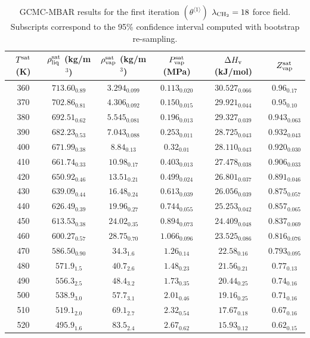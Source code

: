 \documentclass[journal=jctc,manuscript=article]{achemso}
\begin{document}
	\begin{table}[htb!]
		\caption{GCMC-MBAR results for the first iteration $(\theta^{\langle1\rangle})$ $\lambda_{\rm CH_2} = 18$ force field. Subscripts correspond to the 95\% confidence interval computed with bootstrap re-sampling.}
		\begin{center}
			\begin{tabular}{|c|c|c|c|c|c|}
				\hline
				$T^{\rm sat}$ (K) & $\rho_{\rm liq}^{\rm sat}$ (kg/m$^3$) & $\rho_{\rm vap}^{\rm sat}$ (kg/m$^3$) & $P_{\rm vap}^{\rm sat}$ (MPa) & $\Delta H_{\rm v}$ (kJ/mol) & $Z_{\rm vap}^{\rm sat}$ \\ \hline
				360 & $713.60_{0.89}$ & $3.294_{0.099}$ & $0.113_{0.020}$ & $30.527_{0.066}$ & $0.96_{0.17}$ \\
				370 & $702.86_{0.81}$ & $4.306_{0.092}$ & $0.150_{0.015}$ & $29.921_{0.044}$ & $0.95_{0.10}$ \\
				380 & $692.51_{0.62}$ & $5.545_{0.081}$ & $0.196_{0.013}$ & $29.327_{0.039}$ & $0.943_{0.063}$ \\
				390 & $682.23_{0.53}$ & $7.043_{0.088}$ & $0.253_{0.011}$ & $28.725_{0.043}$ & $0.932_{0.043}$ \\
				400 & $671.99_{0.38}$ & $8.84_{0.13}$ & $0.32_{0.01}$ & $28.110_{0.043}$ & $0.920_{0.030}$ \\
				410 & $661.74_{0.33}$ & $10.98_{0.17}$ & $0.403_{0.013}$ & $27.478_{0.038}$ & $0.906_{0.033}$ \\
				420 & $650.92_{0.46}$ & $13.51_{0.21}$ & $0.499_{0.024}$ & $26.801_{0.037}$ & $0.891_{0.046}$ \\
				430 & $639.09_{0.44}$ & $16.48_{0.24}$ & $0.613_{0.039}$ & $26.056_{0.039}$ & $0.875_{0.057}$ \\
				440 & $626.49_{0.39}$ & $19.96_{0.27}$ & $0.744_{0.055}$ & $25.253_{0.042}$ & $0.857_{0.065}$ \\
				450 & $613.53_{0.38}$ & $24.02_{0.35}$ & $0.894_{0.073}$ & $24.409_{0.048}$ & $0.837_{0.069}$ \\
				460 & $600.27_{0.57}$ & $28.75_{0.70}$ & $1.066_{0.096}$ & $23.525_{0.086}$ & $0.816_{0.076}$ \\
				470 & $586.50_{0.90}$ & $34.3_{1.6}$ & $1.26_{0.14}$ & $22.58_{0.16}$ & $0.793_{0.095}$ \\
				480 & $571.9_{1.5}$ & $40.7_{2.6}$ & $1.48_{0.23}$ & $21.56_{0.21}$ & $0.77_{0.13}$ \\
				490 & $556.3_{2.5}$ & $48.4_{3.2}$ & $1.73_{0.35}$ & $20.44_{0.25}$ & $0.74_{0.16}$ \\
				500 & $538.9_{3.0}$ & $57.7_{3.1}$ & $2.01_{0.46}$ & $19.16_{0.25}$ & $0.71_{0.16}$ \\
				510 & $519.1_{2.0}$ & $69.1_{2.7}$ & $2.32_{0.54}$ & $17.67_{0.18}$ & $0.67_{0.16}$ \\
				520 & $495.9_{1.6}$ & $83.5_{2.4}$ & $2.67_{0.62}$ & $15.93_{0.12}$ & $0.62_{0.15}$ \\
				\hline
			\end{tabular}
		\end{center}
	\end{table}
\end{document}
